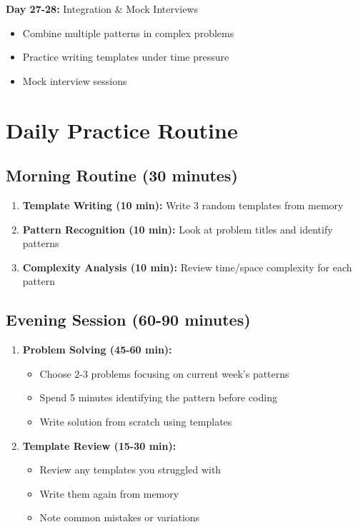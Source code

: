 \documentclass[10pt,a4paper]{article}
\begin{document}
\textbf{Day 27-28:} Integration \& Mock Interviews
\begin{itemize}
\item Combine multiple patterns in complex problems
\item Practice writing templates under time pressure
\item Mock interview sessions
\end{itemize}

\section{Daily Practice Routine}

\subsection{Morning Routine (30 minutes)}
\begin{enumerate}
\item \textbf{Template Writing (10 min):} Write 3 random templates from memory
\item \textbf{Pattern Recognition (10 min):} Look at problem titles and identify patterns
\item \textbf{Complexity Analysis (10 min):} Review time/space complexity for each pattern
\end{enumerate}

\subsection{Evening Session (60-90 minutes)}
\begin{enumerate}
\item \textbf{Problem Solving (45-60 min):}
   \begin{itemize}
   \item Choose 2-3 problems focusing on current week's patterns
   \item Spend 5 minutes identifying the pattern before coding
   \item Write solution from scratch using templates
   \end{itemize}
\item \textbf{Template Review (15-30 min):}
   \begin{itemize}
   \item Review any templates you struggled with
   \item Write them again from memory
   \item Note common mistakes or variations
   \end{itemize}
\end{enumerate}
\end{document}
